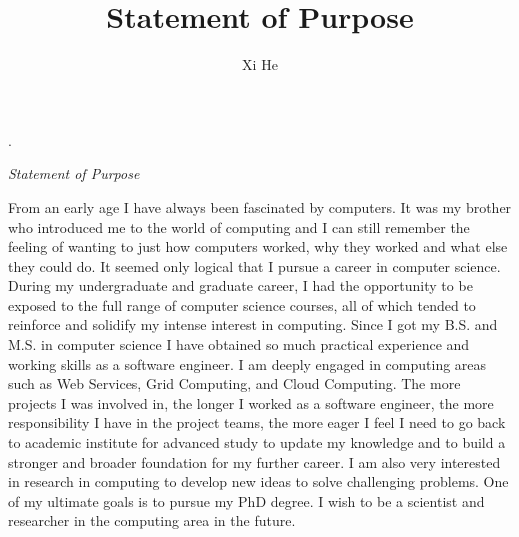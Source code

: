 \documentclass[12pt]{article}
\def\name{Xi He}
\begin{document}
\newcommand{\AUTHOR}{%
Xi He\\
}
\newcommand{\TITLE}{Statement of Purpose}


\title{\TITLE}
\author{\AUTHOR}




.


\begin{center}
{\large {\em Statement of Purpose}}
\end{center}

From an early age I have always been fascinated by computers. It was my brother who introduced me to the world of computing and I can still remember the feeling of wanting to just how computers worked, why they worked and what else they could do. It seemed only logical that I pursue a career in computer science.  During my undergraduate and graduate career, I had the opportunity to be exposed to the full range of computer science courses, all of which tended to reinforce and solidify my intense interest in computing. Since I got my B.S. and M.S. in computer science I have obtained so much practical experience and working skills as a software engineer. I am deeply engaged in computing areas such as Web Services, Grid Computing, and Cloud Computing. The more projects I was involved in, the longer I worked as a software engineer, the more responsibility I have in the project teams, the more eager I feel I need to go back to academic institute for advanced study to update my knowledge and to build a stronger and broader foundation for my further career. I am also very interested in research in computing to develop new ideas to solve challenging problems. One of my ultimate goals is to pursue my PhD degree.  I wish to be a scientist and researcher in the computing area in the future.
\end{document}
